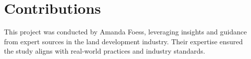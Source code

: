 \section{Contributions}

This project was conducted by Amanda Foess, leveraging insights and guidance
from expert sources in the land development industry. Their expertise ensured the
study aligns with real-world practices and industry standards.